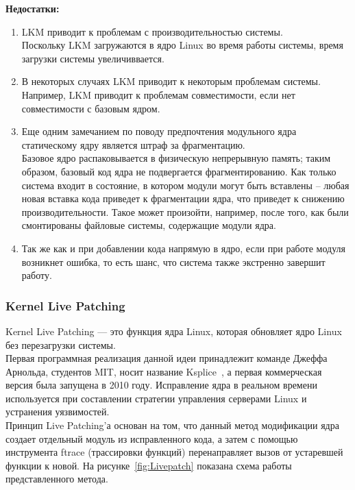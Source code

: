 \textbf{Недостатки:}
\begin{enumerate}
    \item LKM приводит к проблемам с производительностью системы. \vspace{1mm}\\
    Поскольку LKM загружаются в ядро Linux во время работы системы, время загрузки системы увеличиввается.
    \item В некоторых случаях LKM приводит к некоторым проблемам системы.\vspace{1mm}\\
    Например, LKM приводит к проблемам совместимости, если нет совместимости с базовым ядром.
    \item Еще одним замечанием по поводу предпочтения модульного ядра статическому ядру является штраф за фрагментацию. \vspace{1mm}\\
    Базовое ядро распаковывается в физическую непрерывную память;
    таким образом, базовый код ядра не подвергается фрагментированию.
    Как только система входит в состояние, в котором модули могут быть вставлены -- любая новая вставка кода приведет к фрагментации ядра,
    что приведет к снижению производительности.
    Такое может произойти, например, после того, как были смонтированы файловые системы, содержащие модули ядра.
    \item Так же как и при добавлении кода напрямую в ядро, если при работе модуля возникнет ошибка, то есть шанс, что система также экстренно завершит работу.
\end{enumerate}

\subsubsection{Kernel Live Patching}\label{subsec:kernel-live-patching}

Kernel Live Patching --- это функция ядра Linux, которая обновляет ядро Linux без перезагрузки системы.\\
\indent Первая программная реализация данной идеи принадлежит команде Джеффа Арнольда, студентов MIT, носит название Ksplice~\cite{ksplice}, а первая коммерческая версия была запущена в 2010 году.
Исправление ядра в реальном времени используется при составлении стратегии управления серверами Linux и устранения уязвимостей.
\\
Принцип Live Patching’а основан на том, что данный метод модификации ядра создает отдельный модуль из исправленного кода, а затем с помощью инструмента ftrace (трассировки функций) перенаправляет вызов от устаревшей функции к новой.
На рисунке~\ref{fig:Livepatch} показана схема работы представленного метода.

